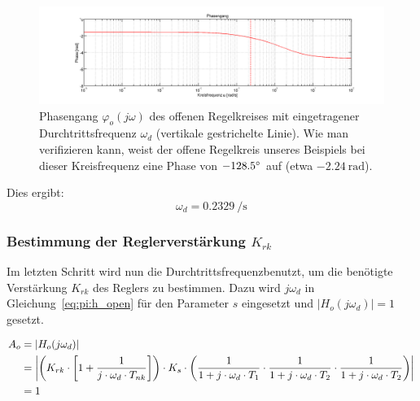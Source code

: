 \begin{figure}[h! width=\pagewidth]
    \includegraphics[width=\textwidth]{images/piOffenerRegelkreisPhasengang.png}
    \caption{%
        Phasengang   $\varphi_o(j\omega)$   des   offenen   Regelkreises   mit
        eingetragener Durchtrittsfrequenz $\omega_{d}$ (vertikale gestrichelte
        Linie). Wie man verifizieren kann, weist der offene Regelkreis unseres
        Beispiels bei dieser Kreisfrequenz  eine Phase von $-128.5\degree$ auf
        (etwa $\SI{-2.24}{\radian}$).
    }
    \label{fig:pi:omega_d}
\end{figure}

Dies ergibt:
\begin{equation} \label{eq:pi:omega_d}
    \omega_d = \SI{0.2329}{\per\second}
\end{equation}


\subsubsection{Bestimmung der Reglerverst\"arkung $K_{rk}$}

Im  letzten  Schritt   wird  nun  die  Durchtrittsfrequenz\footnotemark[3]   benutzt,  um  die
ben\"otigte  Verst\"arkung  $K_{rk}$  des   Reglers  zu  bestimmen. Dazu  wird
$j\omega_d$ in Gleichung~\ref{eq:pi:h_open} f\"ur den Parameter $s$ eingesetzt
und $|H_o(j\omega_d)| = 1$ gesetzt.


\begin{gather} \label{eq:pi:A_o_set_to_one}
    \begin{split}
        A_o & = | H_o (j\omega_d) | \\
            & = \abs*{
                    \bigg(
                        K_{rk} \cdot \biggl[ 1 + \frac{1}{j \cdot \omega_d \cdot T_{nk}} \biggr]
                    \bigg)
                    \cdot
                    K_s
                    \cdot
                    \bigg(
                            \frac{1}{1 + j \cdot \omega_d \cdot T_1}
                      \cdot \frac{1}{1 + j \cdot \omega_d \cdot T_2}
                      \cdot \frac{1}{1 + j \cdot \omega_d \cdot T_2}
                      \bigg)} \\
              & = 1
    \end{split}
\end{gather}

